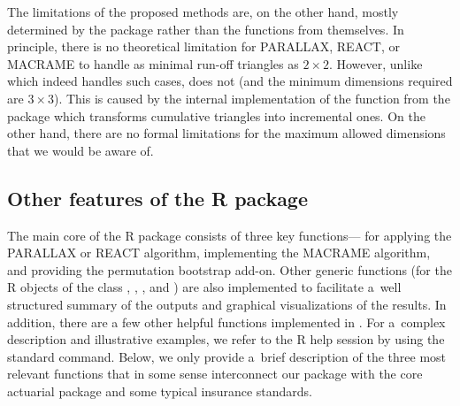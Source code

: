 The limitations of the proposed methods are, on the other hand, mostly determined by the  package rather than the functions from  themselves. In principle, there is no theoretical limitation for PARALLAX, REACT, or MACRAME to handle as minimal run-off triangles as $2 \times 2$. However, unlike  which indeed handles such cases,   does not (and the minimum dimensions required are $3 \times 3$). This is caused by the internal implementation of the  function from the  package which transforms  cumulative triangles into incremental ones. On the other hand, there are no formal limitations for the maximum allowed dimensions that we would be aware of. 

\subsection{Other features of the R package }
\label{Raddons}
The main core of the R package  consists of three key functions--- for applying the PARALLAX or REACT algorithm,  implementing the MACRAME algorithm, and  providing the permutation bootstrap add-on. Other generic functions (for the R objects of the class , , , and ) are also implemented to facilitate a~well structured summary of the outputs and  graphical visualizations of the results. In addition, there are a few other helpful functions implemented in . For a~complex description and illustrative examples, we  refer to the R help session by using the standard  command. Below, we only provide a~brief description of the three  most relevant functions that in some sense interconnect our package  with the core actuarial package  and some typical insurance standards.  

